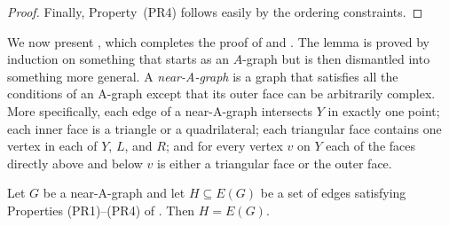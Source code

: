 \begin{proof}
		
		Finally, Property~(PR4) follows easily by the ordering constraints.
	\end{proof}
	
We now present , which completes the proof of  and . The lemma is proved by induction on something
that starts as an $A$-graph but is then dismantled into something
more general.  A \emph{near-A-graph} is a graph that satisfies all the
conditions of an A-graph except that its outer face can be arbitrarily
complex.  More specifically, each edge of a near-A-graph intersects $Y$
in exactly one point; each inner face is a triangle or a quadrilateral;
each triangular face contains one vertex in each of $Y$, $L$, and $R$;
and for every vertex $v$ on $Y$ each of the faces directly above and
below $v$ is either a triangular face or the outer face.

\begin{lem}
Let $G$ be a near-A-graph and let $H \subseteq E(G)$ be a set of edges satisfying Properties (PR1)--(PR4) of . 
	Then $H=E(G)$.
\end{lem}

